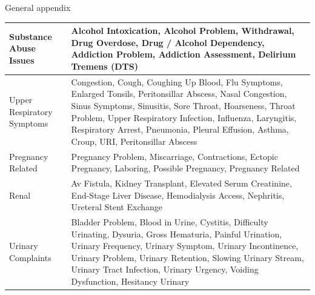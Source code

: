 \documentclass[,,nonblindrev]{informs}
\begin{document}
\begin{APPENDIX}{General appendix}
\begin{longtable}{|p{5cm}|p{12cm}|}
\hline
Substance Abuse Issues & Alcohol Intoxication, Alcohol Problem, Withdrawal, Drug Overdose, Drug / Alcohol Dependency, Addiction Problem, Addiction Assessment, Delirium Tremens (DTS) \\
\hline
Upper Respiratory Symptoms & Congestion, Cough, Coughing Up Blood, Flu Symptoms, Enlarged Tonsils, Peritonsillar Abscess, Nasal Congestion, Sinus Symptoms, Sinusitis, Sore Throat, Hoarseness, Throat Problem, Upper Respiratory Infection, Influenza, Laryngitis, Respiratory Arrest, Pneumonia, Pleural Effusion, Asthma, Croup, URI, Peritonsillar Abscess \\
\hline
Pregnancy Related & Pregnancy Problem, Miscarriage, Contractions, Ectopic Pregnancy, Laboring, Possible Pregnancy, Pregnancy Related \\
\hline
Renal & Av Fistula, Kidney Transplant, Elevated Serum Creatinine, End-Stage Liver Disease, Hemodialysis Access, Nephritis, Ureteral Stent Exchange \\
\hline
Urinary Complaints & Bladder Problem, Blood in Urine, Cystitis, Difficulty Urinating, Dysuria, Gross Hematuria, Painful Urination, Urinary Frequency, Urinary Symptom, Urinary Incontinence, Urinary Problem, Urinary Retention, Slowing Urinary Stream, Urinary Tract Infection, Urinary Urgency, Voiding Dysfunction, Hesitancy Urinary \\
\hline
\end{longtable}

\end{APPENDIX}

%
%
%





\end{document}
